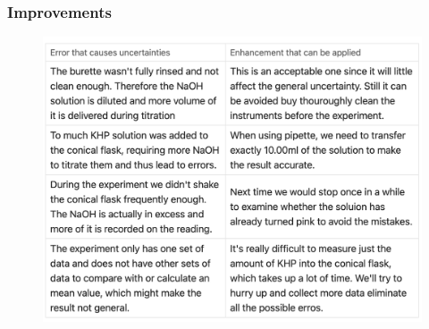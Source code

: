 \documentclass[12pt]{article}
\begin{document}
\subsubsection{Improvements}
\begin{figure}[H]
    \centering
    \includegraphics[width = 16cm]{improvments.png}
\end{figure}
\end{document}
